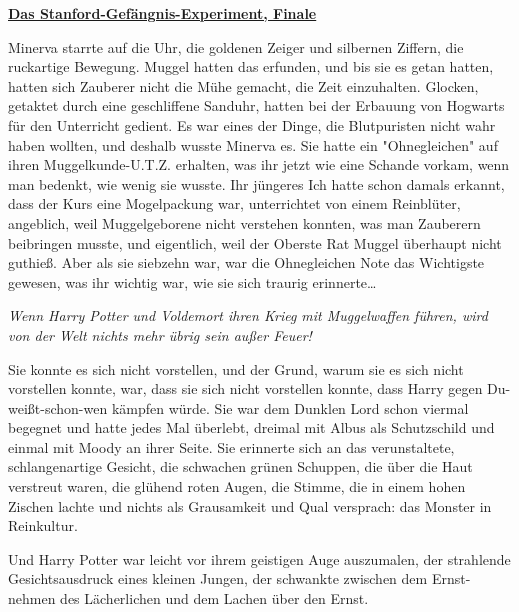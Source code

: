 

\hypertarget{das-stanford-gefuxe4ngnis-experiment-finale}{%

\textbf{\uline{Das Stanford-Gefängnis-Experiment, Finale}}

Minerva starrte auf die Uhr, die goldenen Zeiger und silbernen Ziffern, die ruckartige Bewegung. Muggel hatten das erfunden, und bis sie es getan hatten, hatten sich Zauberer nicht die Mühe gemacht, die Zeit einzuhalten. Glocken, getaktet durch eine geschliffene Sanduhr, hatten bei der Erbauung von Hogwarts für den Unterricht gedient. Es war eines der Dinge, die Blutpuristen nicht wahr haben wollten, und deshalb wusste Minerva es. Sie hatte ein "Ohnegleichen" auf ihren Muggelkunde-U.T.Z. erhalten, was ihr jetzt wie eine Schande vorkam, wenn man bedenkt, wie wenig sie wusste. Ihr jüngeres Ich hatte schon damals erkannt, dass der Kurs eine Mogelpackung war, unterrichtet von einem Reinblüter, angeblich, weil Muggelgeborene nicht verstehen konnten, was man Zauberern beibringen musste, und eigentlich, weil der Oberste Rat Muggel überhaupt nicht guthieß. Aber als sie siebzehn war, war die Ohnegleichen Note das Wichtigste gewesen, was ihr wichtig war, wie sie sich traurig erinnerte…

\emph{Wenn Harry Potter und Voldemort ihren Krieg mit Muggelwaffen führen, wird von der Welt nichts mehr übrig sein außer Feuer!}

Sie konnte es sich nicht vorstellen, und der Grund, warum sie es sich nicht vorstellen konnte, war, dass sie sich nicht vorstellen konnte, dass Harry gegen Du-weißt-schon-wen kämpfen würde. Sie war dem Dunklen Lord schon viermal begegnet und hatte jedes Mal überlebt, dreimal mit Albus als Schutzschild und einmal mit Moody an ihrer Seite. Sie erinnerte sich an das verunstaltete, schlangenartige Gesicht, die schwachen grünen Schuppen, die über die Haut verstreut waren, die glühend roten Augen, die Stimme, die in einem hohen Zischen lachte und nichts als Grausamkeit und Qual versprach: das Monster in Reinkultur.

Und Harry Potter war leicht vor ihrem geistigen Auge auszumalen, der strahlende Gesichtsausdruck eines kleinen Jungen, der schwankte zwischen dem Ernst-nehmen des Lächerlichen und dem Lachen über den Ernst.

}
